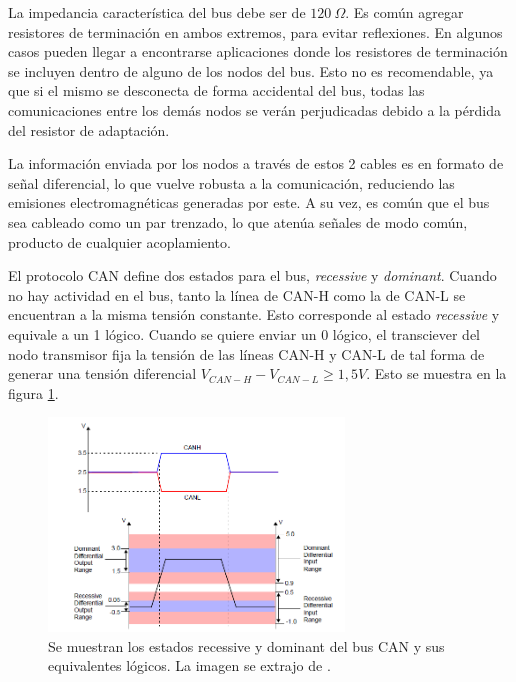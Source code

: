 La impedancia característica del bus debe ser de $120 \ \Omega$. Es común agregar resistores de terminación en ambos extremos, para evitar reflexiones. En algunos casos pueden llegar a encontrarse aplicaciones donde los resistores de terminación se incluyen dentro de alguno de los nodos del bus. Esto no es recomendable, ya que si el mismo se desconecta de forma accidental del bus, todas las comunicaciones entre los demás nodos se verán perjudicadas debido a la pérdida del resistor de adaptación.

La información enviada por los nodos a través de estos 2 cables es en formato de señal diferencial, lo que vuelve robusta a la comunicación, reduciendo las emisiones electromagnéticas generadas por este. A su vez, es común que el bus sea cableado como un par trenzado, lo que atenúa señales de modo común, producto de cualquier acoplamiento.


El protocolo CAN define dos estados para el bus, \textit{recessive} y \textit{dominant}. Cuando no hay actividad en el bus, tanto la línea de CAN-H como la de CAN-L se encuentran a la misma tensión constante. Esto corresponde al estado \textit{recessive} y equivale a un 1 lógico. Cuando se quiere enviar un 0 lógico, el transciever del nodo transmisor fija la tensión de las líneas CAN-H y CAN-L de tal forma de generar una tensión diferencial $V_{CAN-H} - V_{CAN-L} \geq 1,5 V$. Esto se muestra en la figura \ref{fig:CAN_recessive_dominant}.

\begin{figure}[htb]
    \centering
    \includegraphics[width=0.7\textwidth]{img/CAN_recessive_dominant.png}
    \caption{Se muestran los estados recessive y dominant del bus CAN y sus equivalentes lógicos. La imagen se extrajo de \cite{AN228}.}
    \label{fig:CAN_recessive_dominant}    
\end{figure}

